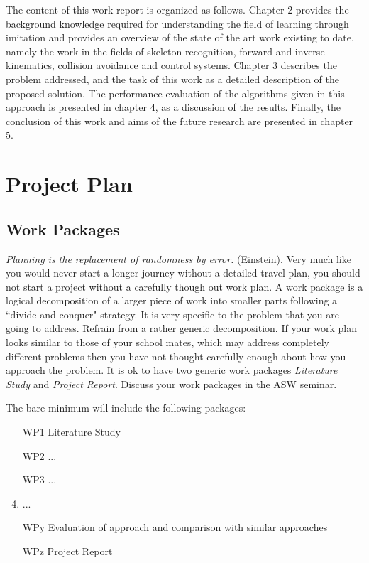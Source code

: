 \documentclass[thesis]{mas_proposal}
\begin{document}
\begin{itemize}
    The content of this work report is organized as follows. Chapter 2 provides the background knowledge required for understanding the field of learning through imitation and provides an overview of the state of the art work existing to date, namely the work in the fields of skeleton recognition, forward and inverse kinematics, collision avoidance and control systems. Chapter 3 describes the problem addressed, and the task of this work as a detailed description of the proposed solution. The performance evaluation of the algorithms given in this approach is presented in chapter 4, as a discussion of the results. Finally, the conclusion of this work and aims of the future research are presented in chapter 5.
\end{itemize}


\section{Project Plan}

\subsection{Work Packages}
\emph{Planning is the replacement of randomness by error.} (Einstein). Very much like you would never start a longer journey without a detailed travel plan, you should not start a project without a carefully though out work plan. A work package is a logical decomposition of a larger piece of work into smaller parts following a ``divide and conquer" strategy. It is very specific to the problem that you are going to address. Refrain from a rather generic decomposition. If your work plan looks similar to those of your school mates, which may address completely different problems then you have not thought carefully enough about how you approach the problem. It is ok to have two generic work packages \emph{Literature Study} and \emph{Project Report}. Discuss your work packages in the ASW seminar.

The bare minimum will include the following packages:
\begin{enumerate}
    \item[WP1] Literature Study
    \item[WP2] ...
    \item[WP3] ...
    \item  ...
    \item[WPy] Evaluation of approach and comparison with similar approaches
    \item[WPz] Project Report
\end{enumerate}
\end{document}

